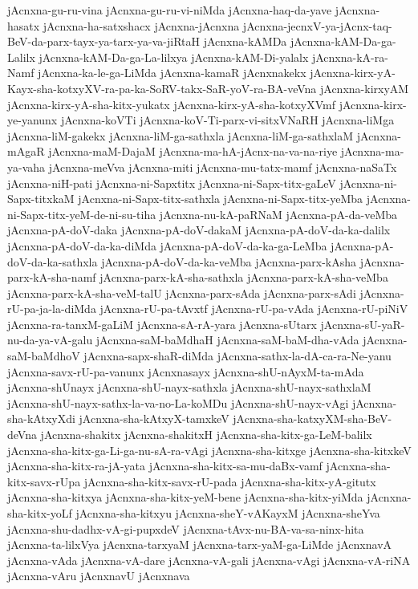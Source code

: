 {jAcnxna-gu-ru-vina
jAcnxna-gu-ru-vi-niMda
jAcnxna-haq-da-yave
jAcnxna-hasatx
jAcnxna-ha-satxshacx
jAcnxna-jAcnxna
jAcnxna-jecnxV-ya-jAcnx-taq-BeV-da-parx-tayx-ya-tarx-ya-va-jiRtaH
jAcnxna-kAMDa
jAcnxna-kAM-Da-ga-Lalilx
jAcnxna-kAM-Da-ga-La-lilxya
jAcnxna-kAM-Di-yalalx
jAcnxna-kA-ra-Namf
jAcnxna-ka-le-ga-LiMda
jAcnxna-kamaR
jAcnxnakekx
jAcnxna-kirx-yA-Kayx-sha-kotxyXV-ra-pa-ka-SoRV-takx-SaR-yoV-ra-BA-veVna
jAcnxna-kirxyAM
jAcnxna-kirx-yA-sha-kitx-yukatx
jAcnxna-kirx-yA-sha-kotxyXVmf
jAcnxna-kirx-ye-yanunx
jAcnxna-koVTi
jAcnxna-koV-Ti-parx-vi-sitxVNaRH
jAcnxna-liMga
jAcnxna-liM-gakekx
jAcnxna-liM-ga-sathxla
jAcnxna-liM-ga-sathxlaM
jAcnxna-mAgaR
jAcnxna-maM-DajaM
jAcnxna-ma-hA-jAcnx-na-va-na-riye
jAcnxna-ma-ya-vaha
jAcnxna-meVva
jAcnxna-miti
jAcnxna-mu-tatx-mamf
jAcnxna-naSaTx
jAcnxna-niH-pati
jAcnxna-ni-Sapxtitx
jAcnxna-ni-Sapx-titx-gaLeV
jAcnxna-ni-Sapx-titxkaM
jAcnxna-ni-Sapx-titx-sathxla
jAcnxna-ni-Sapx-titx-yeMba
jAcnxna-ni-Sapx-titx-yeM-de-ni-su-tiha
jAcnxna-nu-kA-paRNaM
jAcnxna-pA-da-veMba
jAcnxna-pA-doV-daka
jAcnxna-pA-doV-dakaM
jAcnxna-pA-doV-da-ka-dalilx
jAcnxna-pA-doV-da-ka-diMda
jAcnxna-pA-doV-da-ka-ga-LeMba
jAcnxna-pA-doV-da-ka-sathxla
jAcnxna-pA-doV-da-ka-veMba
jAcnxna-parx-kAsha
jAcnxna-parx-kA-sha-namf
jAcnxna-parx-kA-sha-sathxla
jAcnxna-parx-kA-sha-veMba
jAcnxna-parx-kA-sha-veM-talU
jAcnxna-parx-sAda
jAcnxna-parx-sAdi
jAcnxna-rU-pa-ja-la-diMda
jAcnxna-rU-pa-tAvxtf
jAcnxna-rU-pa-vAda
jAcnxna-rU-piNiV
jAcnxna-ra-tanxM-gaLiM
jAcnxna-sA-rA-yara
jAcnxna-sUtarx
jAcnxna-sU-yaR-nu-da-ya-vA-galu
jAcnxna-saM-baMdhaH
jAcnxna-saM-baM-dha-vAda
jAcnxna-saM-baMdhoV
jAcnxna-sapx-shaR-diMda
jAcnxna-sathx-la-dA-ca-ra-Ne-yanu
jAcnxna-savx-rU-pa-vanunx
jAcnxnasayx
jAcnxna-shU-nAyxM-ta-mAda
jAcnxna-shUnayx
jAcnxna-shU-nayx-sathxla
jAcnxna-shU-nayx-sathxlaM
jAcnxna-shU-nayx-sathx-la-va-no-La-koMDu
jAcnxna-shU-nayx-vAgi
jAcnxna-sha-kAtxyXdi
jAcnxna-sha-kAtxyX-tamxkeV
jAcnxna-sha-katxyXM-sha-BeV-deVna
jAcnxna-shakitx
jAcnxna-shakitxH
jAcnxna-sha-kitx-ga-LeM-balilx
jAcnxna-sha-kitx-ga-Li-ga-nu-sA-ra-vAgi
jAcnxna-sha-kitxge
jAcnxna-sha-kitxkeV
jAcnxna-sha-kitx-ra-jA-yata
jAcnxna-sha-kitx-sa-mu-daBx-vamf
jAcnxna-sha-kitx-savx-rUpa
jAcnxna-sha-kitx-savx-rU-pada
jAcnxna-sha-kitx-yA-gitutx
jAcnxna-sha-kitxya
jAcnxna-sha-kitx-yeM-bene
jAcnxna-sha-kitx-yiMda
jAcnxna-sha-kitx-yoLf
jAcnxna-sha-kitxyu
jAcnxna-sheY-vAKayxM
jAcnxna-sheYva
jAcnxna-shu-dadhx-vA-gi-pupxdeV
jAcnxna-tAvx-nu-BA-va-sa-ninx-hita
jAcnxna-ta-lilxVya
jAcnxna-tarxyaM
jAcnxna-tarx-yaM-ga-LiMde
jAcnxnavA
jAcnxna-vAda
jAcnxna-vA-dare
jAcnxna-vA-gali
jAcnxna-vAgi
jAcnxna-vA-riNA
jAcnxna-vAru
jAcnxnavU
jAcnxnava
}
